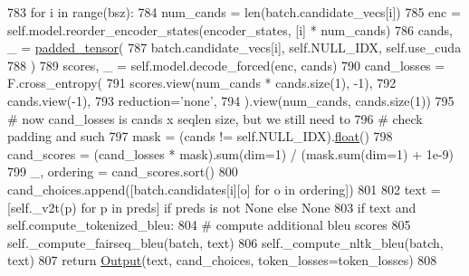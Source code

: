 \begin{DoxyCode}
783             \textcolor{keywordflow}{for} i \textcolor{keywordflow}{in} range(bsz):
784                 num\_cands = len(batch.candidate\_vecs[i])
785                 enc = self.model.reorder\_encoder\_states(encoder\_states, [i] * num\_cands)
786                 cands, \_ = \hyperlink{namespaceparlai_1_1agents_1_1legacy__agents_1_1seq2seq_1_1utils__v1_adb5a414ae439f14c54e8c760b91cc4c8}{padded\_tensor}(
787                     batch.candidate\_vecs[i], self.NULL\_IDX, self.use\_cuda
788                 )
789                 scores, \_ = self.model.decode\_forced(enc, cands)
790                 cand\_losses = F.cross\_entropy(
791                     scores.view(num\_cands * cands.size(1), -1),
792                     cands.view(-1),
793                     reduction=\textcolor{stringliteral}{'none'},
794                 ).view(num\_cands, cands.size(1))
795                 \textcolor{comment}{# now cand\_losses is cands x seqlen size, but we still need to}
796                 \textcolor{comment}{# check padding and such}
797                 mask = (cands != self.NULL\_IDX).\hyperlink{namespaceprojects_1_1controllable__dialogue_1_1make__control__dataset_aa2b7207688c641dbc094ab44eca27113}{float}()
798                 cand\_scores = (cand\_losses * mask).sum(dim=1) / (mask.sum(dim=1) + 1e-9)
799                 \_, ordering = cand\_scores.sort()
800                 cand\_choices.append([batch.candidates[i][o] \textcolor{keywordflow}{for} o \textcolor{keywordflow}{in} ordering])
801 
802         text = [self.\_v2t(p) \textcolor{keywordflow}{for} p \textcolor{keywordflow}{in} preds] \textcolor{keywordflow}{if} preds \textcolor{keywordflow}{is} \textcolor{keywordflow}{not} \textcolor{keywordtype}{None} \textcolor{keywordflow}{else} \textcolor{keywordtype}{None}
803         \textcolor{keywordflow}{if} text \textcolor{keywordflow}{and} self.compute\_tokenized\_bleu:
804             \textcolor{comment}{# compute additional bleu scores}
805             self.\_compute\_fairseq\_bleu(batch, text)
806             self.\_compute\_nltk\_bleu(batch, text)
807         \textcolor{keywordflow}{return} \hyperlink{namespaceparlai_1_1agents_1_1legacy__agents_1_1seq2seq_1_1torch__agent__v1_a2689006ea97d09413fb242f984bd8016}{Output}(text, cand\_choices, token\_losses=token\_losses)
808 
\end{DoxyCode}
\mbox{\label{classparlai_1_1core_1_1torch__generator__agent_1_1TorchGeneratorAgent_a3ed32722f939a8afd258830b7093fc18}} 
